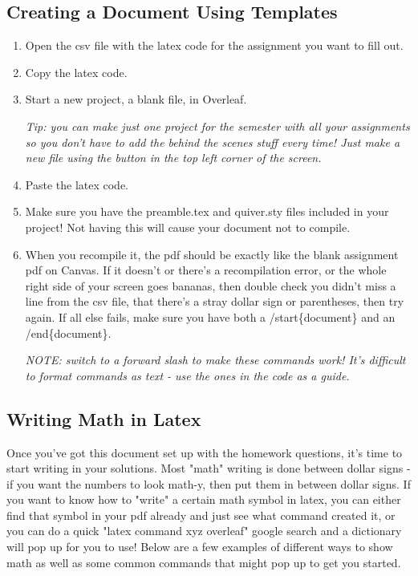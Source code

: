 \documentclass[11 pt]{article}
\begin{document}
\subsection{Creating a Document Using Templates}

\begin{enumerate}
    \item Open the csv file with the latex code for the assignment you want to fill out.
    \item Copy the latex code.
    \item Start a new project, a blank file, in Overleaf. 
    
    \textit{Tip: you can make just one project for the semester with all your assignments so you don't have to add the behind the scenes stuff every time! Just make a new file using the button in the top left corner of the screen.}
    \item Paste the latex code.
    \item Make sure you have the preamble.tex and quiver.sty files included in your project! Not having this will cause your document not to compile.
    \item When you recompile it, the pdf should be exactly like the blank assignment pdf on Canvas. If it doesn't or there's a recompilation error, or the whole right side of your screen goes bananas, then double check you didn't miss a line from the csv file, that there's a stray dollar sign or parentheses, then try again. If all else fails, make sure you have both a /start\{document\} and an /end\{document\}. 
    
    \textit{NOTE: switch to a forward slash to make these commands work! It's difficult to format commands as text - use the ones in the code as a guide.}
\end{enumerate}

\pagebreak


\subsection{Writing Math in Latex}

Once you've got this document set up with the homework questions, it's time to start writing in your solutions. Most "math" writing is done between dollar signs - if you want the numbers to look math-y, then put them in between dollar signs. If you want to know how to "write" a certain math symbol in latex, you can either find that symbol in your pdf already and just see what command created it, or you can do a quick "latex command xyz overleaf" google search and a dictionary will pop up for you to use! Below are a few examples of different ways to show math as well as some common commands that might pop up to get you started.
\end{document}
